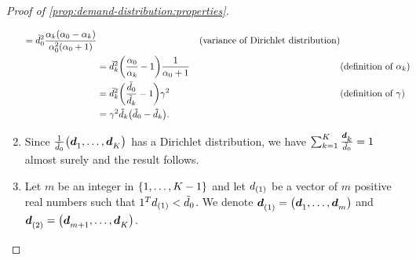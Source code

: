 \begin{proof}[Proof of \cref{prop:demand-distribution:properties}]
\begin{enumerate}
\begin{subequations}
\begin{align}
  = \tilde{\demand}_0^2
  \frac{\alpha_k\bracket{\alpha_0-\alpha_k}}{\alpha_0^2\bracket{\alpha_0+1}}
  && \mbox{(variance of Dirichlet distribution)}
  \\
  &= \tilde{\demand}_k^2 \bracket{\frac{\alpha_0}{\alpha_k}-1}\frac{1}{\alpha_0+1}
  && \mbox{(definition of $\alpha_k$)}
  \\
  &= \tilde{\demand}_k^2 \bracket{\frac{\tilde{\demand}_0}{\tilde{\demand}_k}-1}\gamma^2
  && \mbox{(definition of $\gamma$)}
  \\
  &= \gamma^2 \tilde{\demand}_k \bracket{\tilde{\demand}_0-\tilde{\demand}_k}.
\end{align}
\end{subequations}
\item Since $\frac{1}{\tilde{\demand}_0}\bracket{\va\demand_1,\ldots,\va\demand_K}$ has a Dirichlet distribution, we have $\sum_{k=1}^K \frac{\va\demand_k}{\tilde{\demand}_0}=1$ almost surely and the result follows.
\item Let $m$ be an integer in $\range[1]{K-1}$ and let $d_{(1)}$ be a vector of $m$ positive real numbers such that $1^T d_{(1)}<\tilde{d}_0$.
We denote $\va\demand_{(1)}=\bracket{\va\demand_1,\ldots,\va\demand_m}$ and $\va\demand_{(2)}=\bracket{\va\demand_{m+1},\ldots,\va\demand_K}$.


\end{enumerate}
\end{proof}
